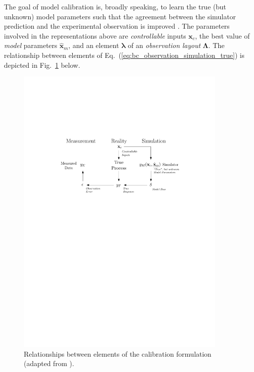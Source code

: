 The goal of model calibration is, broadly speaking, to learn the true (but unknown) model parameters such that the agreement between the simulator prediction and the experimental observation is improved \cite{Kennedy2001,Ling2014}.
The parameters involved in the representations above are \emph{controllable} inputs $\bm{x}_c$,
the best value of \emph{model} parameters $\hat{\bm{x}}_m$, and an element $\boldsymbol{\lambda}$ of an \emph{observation layout} $\boldsymbol{\Lambda}$.
The relationship between elements of Eq.~(\ref{eq:bc_observation_simulation_true}) is depicted in Fig.~\ref{fig:ch5_hm_error_model} below.
\begin{figure}[bth]	
	\centering
	\includegraphics[width=0.91\textwidth]{../figures/chapter5/figures/HMErrorModel}
	\caption[Relationships between elements of the calibration formulation.]{Relationships between elements of the calibration formulation (adapted from \cite{Huard2006}).}
	\label{fig:ch5_hm_error_model}
\end{figure}

